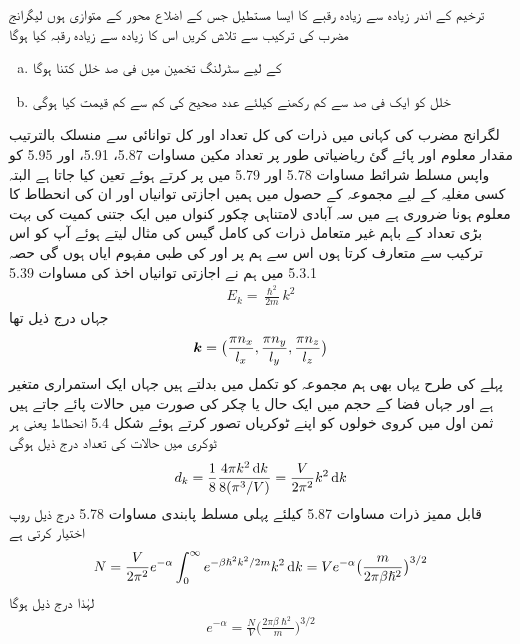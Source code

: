 ترخیم  کے اندر زیادہ سے زیادہ رقبے کا ایسا مستطیل جس کے اضلاع محور کے متوازی ہوں ليگرانج مضرب کی ترکیب سے تلاش کریں اس کا زیادہ سے زیادہ رقبہ کیا ہوگا 
\begin{enumerate}[a.]
\item
{} کے لیے سٹرلنگ تخمین میں فی صد خلل کتنا ہوگا 
\item
خلل کو ایک فی صد سے کم رکھنے کیلئے عدد صحیح  کی کم سے کم قیمت کیا ہوگی 
\end{enumerate}
لگرانج مضرب کی کہانی میں ذرات کی کل تعداد اور کل توانائی سے منسلک بالترتیب مقدار معلوم  اور  پائے گئ ریاضیاتی طور پر تعداد مکین مساوات 5.87، 5.91، اور 5.95 کو واپس مسلط شرائط مساوات 5.78 اور 5.79 میں پر کرتے ہوئے تعین کیا جاتا ہے البتہ کسی مغلیہ کے لیے مجموعہ کے حصول میں ہمیں اجازتی توانیاں  اور ان کی انحطاط  کا معلوم ہونا ضروری ہے میں سہ آبادی لامتناہی چکور کنواں میں ایک جتنی کمیت کی بہت بڑی تعداد کے باہم غیر متعامل ذرات کی کامل گیس کی مثال لیتے ہوئے آپ کو اس ترکیب سے متعارف کرتا ہوں اس سے ہم پر  اور  کی طبی مفہوم ایاں ہوں گی حصہ 5.3.1 میں ہم نے اجازتی توانیاں اخذ کی مساوات 5.39 
\begin{align}
E_k = \frac{\hslash^2}{2 m} k^2
\end{align}
جہاں درج ذیل تھا 
\begin{align*}
{\ensuremath{{\boldsymbol{k}}}} = \big ( \frac{\pi n_x}{l_x} , \frac{\pi n_y}{l_y} , \frac{\pi n_z}{l_z} \big )
\end{align*}
پہلے کی طرح یہاں بھی ہم مجموعہ کو تکمل میں بدلتے ہیں جہاں  ایک استمراری متغیر ہے اور جہاں  فضا کے  حجم میں ایک حال یا چکر  کی صورت میں  حالات پائے جاتے ہیں ثمن اول میں کروی خولوں  کو اپنے ٹوکریاں تصور کرتے ہوئے شکل 5.4 انحطاط یعنی ہر ٹوکری میں حالات کی تعداد درج ذیل ہوگی 
\begin{align}
d_k = \frac{1}{8} \frac{4 \pi k^2 \dif  k}{8 (\pi^3 /V)} = \frac{V}{2 \pi^2} k^2 \dif k
\end{align}
قابل ممیز ذرات مساوات 5.87 کیلئے پہلی مسلط پابندی مساوات 5.78 درج ذیل روپ اختیار کرتی ہے 
\begin{align*}
N = \frac{V}{2 \pi^2} e^{- \alpha} \int_0^{\infty} e^{- \beta \hslash^2 k^2 / 2m} k^2 \dif  k = V e^{- \alpha} \big ( \frac{m}{2 \pi \beta \hslash^2} \big )^{3/2}
\end{align*}
لہٰذا درج ذیل ہوگا 
\begin{align}
e^{- \alpha} = \frac{N}{V} \big ( \frac{2 \pi \beta \hslash^2}{m} \big )^{3/2}
\end{align}
